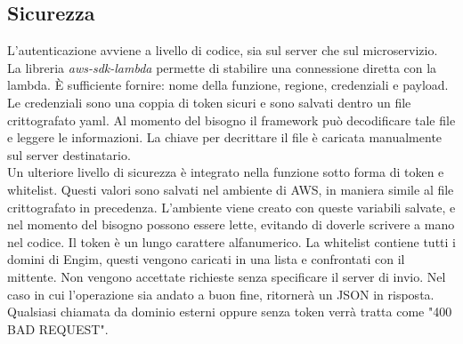 \documentclass[12pt]{article}
\begin{document}
\subsection{Sicurezza}
L'autenticazione avviene a livello di codice, sia sul server che sul microservizio.
\\ La libreria \textit{aws-sdk-lambda} permette di stabilire una connessione diretta con la 
lambda.
È sufficiente fornire: nome della funzione, regione, credenziali e payload. 
Le credenziali sono una coppia di token sicuri e 
sono salvati dentro un file crittografato yaml. 
Al momento del bisogno il framework può decodificare tale file e 
leggere le informazioni. 
La chiave per decrittare il file è caricata manualmente sul server destinatario.
\\ Un ulteriore livello di sicurezza è integrato nella funzione sotto forma 
di token e whitelist. 
Questi valori sono salvati nel ambiente di AWS, in maniera simile al file 
crittografato in precedenza. 
L'ambiente viene creato con queste variabili salvate, e nel momento del 
bisogno possono essere lette, evitando di doverle scrivere a mano nel codice.
Il token è un lungo carattere alfanumerico.
La whitelist contiene tutti i domini di Engim, questi vengono caricati in 
una lista e confrontati con il mittente. 
Non vengono accettate richieste senza specificare il server di invio.
Nel caso in cui l'operazione sia andato a buon fine, ritornerà un JSON in risposta.
\\ Qualsiasi chiamata da dominio esterni oppure senza token verrà tratta come 
"400 BAD REQUEST". 
\end{document}
